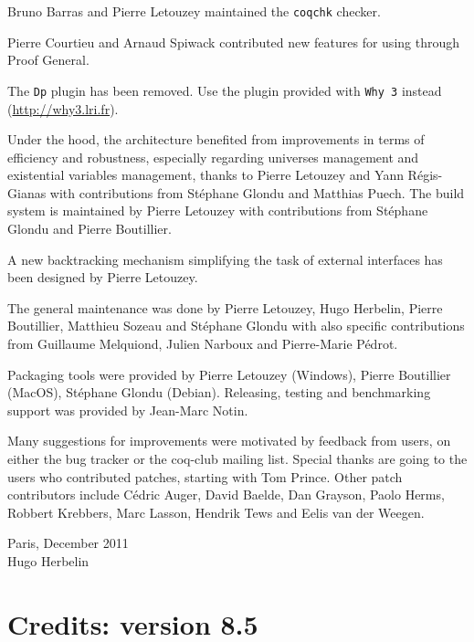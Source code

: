 Bruno Barras and Pierre Letouzey maintained the {\tt coqchk} checker.

Pierre Courtieu and Arnaud Spiwack contributed new features for using
{\Coq} through Proof General.

The {\tt Dp} plugin has been removed. Use the plugin provided with
{\tt Why 3} instead (\url{http://why3.lri.fr}).

Under the hood, the {\Coq} architecture benefited from improvements in
terms of efficiency and robustness, especially regarding universes
management and existential variables management, thanks to Pierre
Letouzey and Yann R\'egis-Gianas with contributions from St\'ephane
Glondu and Matthias Puech. The build system is maintained by Pierre
Letouzey with contributions from St\'ephane Glondu and Pierre
Boutillier.

A new backtracking mechanism simplifying the task of external
interfaces has been designed by Pierre Letouzey.

The general maintenance was done by Pierre Letouzey, Hugo Herbelin,
Pierre Boutillier, Matthieu Sozeau and St\'ephane Glondu with also
specific contributions from Guillaume Melquiond, Julien Narboux and
Pierre-Marie Pédrot.

Packaging tools were provided by Pierre Letouzey (Windows), Pierre
Boutillier (MacOS), St\'ephane Glondu (Debian). Releasing, testing and
benchmarking support was provided by Jean-Marc Notin.

Many suggestions for improvements were motivated by feedback from
users, on either the bug tracker or the coq-club mailing list. Special
thanks are going to the users who contributed patches, starting with
Tom Prince. Other patch contributors include C\'edric Auger, David
Baelde, Dan Grayson, Paolo Herms, Robbert Krebbers, Marc Lasson,
Hendrik Tews and Eelis van der Weegen.

\begin{flushright}
Paris, December 2011\\
Hugo Herbelin\\
\end{flushright}


\section*{Credits: version 8.5}


